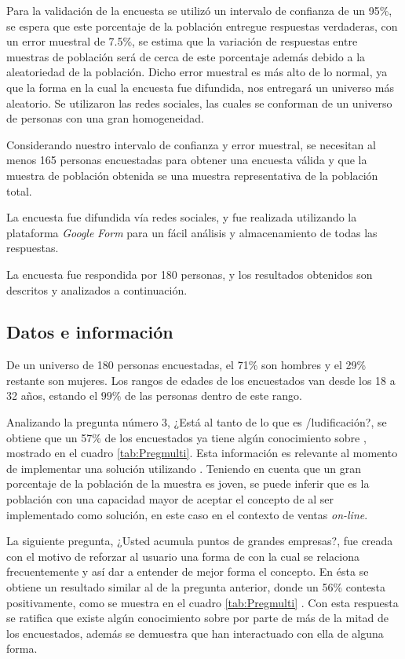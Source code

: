 Para la validación de la encuesta se utilizó un intervalo de confianza de un 95\%,
se espera que este porcentaje de la población entregue respuestas verdaderas,
con un error muestral de 7.5\%, se estima que la variación de respuestas entre
muestras de población será de cerca de este porcentaje además debido a la
aleatoriedad de la población.
Dicho error muestral es más alto de lo normal, ya que la forma en la cual la
encuesta fue difundida, nos entregará un universo más aleatorio.
Se utilizaron las redes sociales, las cuales se conforman de un universo de personas
con una gran homogeneidad.

Considerando nuestro intervalo de confianza y error muestral,
se necesitan al menos 165 personas encuestadas para obtener una encuesta válida
y que la muestra de población obtenida se una muestra representativa de la
población total.

La encuesta fue difundida vía redes sociales, y fue realizada utilizando la plataforma \emph{Google} 
\emph{Form} para un fácil análisis y almacenamiento de todas las respuestas.

La encuesta fue respondida por 180 personas, y los resultados obtenidos son
descritos y analizados a continuación.

\subsection{Datos e información}

De un universo de 180 personas encuestadas, el 71\% son hombres y el 29\%
restante son mujeres.
Los rangos de edades de los encuestados van desde los 18 a 32 años,
estando el $99\%$ de las personas dentro de este rango.

Analizando la pregunta número $3$, ¿Está al tanto de lo que es {\gam}/ludificación?, se obtiene que  un 57\% 
de los encuestados ya tiene algún conocimiento sobre {\gam}, mostrado en el cuadro \ref{tab:Pregmulti}.
Esta información es relevante al momento de implementar una solución utilizando {\gam}.
Teniendo en cuenta que un gran porcentaje de la población de la muestra es joven,
se puede inferir que es la población con una capacidad mayor de aceptar el
concepto de {\gam} al ser implementado como solución, en este caso en el
contexto de ventas \emph{on-line}.

La siguiente pregunta,
¿Usted acumula puntos de grandes empresas?, fue creada con el motivo de reforzar
al usuario una forma de {\gam} con la cual se relaciona frecuentemente y así dar
a entender de mejor forma el concepto.
En ésta se obtiene un resultado similar al de la pregunta anterior,
donde un 56\% contesta positivamente, como se muestra en el cuadro \ref{tab:Pregmulti} .
Con esta respuesta se ratifica que existe algún conocimiento sobre {\gam} por parte
de más de la mitad de los encuestados, además se demuestra que han interactuado con
ella de alguna forma.

